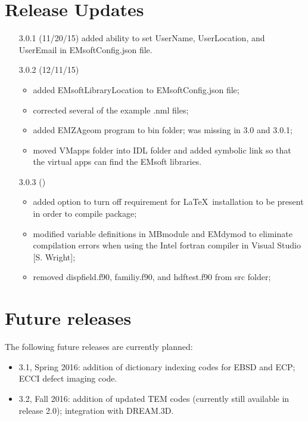 \documentclass[DIV=calc, paper=letter, fontsize=11pt]{scrartcl}	 %
\begin{document}
\newpage
\section{Release Updates}
\begin{itemize}
	\item[3.0.1] (11/20/15) added ability to set UserName, UserLocation, and UserEmail in \textsf{EMsoftConfig.json} file.
	\item[3.0.2] (12/11/15) \begin{itemize}
		\item added EMsoftLibraryLocation to \textsf{EMsoftConfig.json} file;
		\item corrected several of the example .nml files;
		\item added EMZAgeom program to bin folder; was missing in 3.0 and 3.0.1;
		\item moved VMapps folder into IDL folder and added symbolic link so that the virtual apps can find the EMsoft libraries.
	\end{itemize}
        \item[3.0.3] () \begin{itemize}
                \item added option to turn off requirement for \LaTeX\ installation to be present in order to compile package;
                \item modified variable definitions in MBmodule and EMdymod to eliminate compilation errors when using the Intel fortran 
                compiler in Visual Studio [S. Wright]; 
                \item removed dispfield.f90, familiy.f90, and hdftest.f90 from src folder;
        \end{itemize}
\end{itemize}

\section{Future releases}
The following future releases are currently planned:
\begin{itemize}
	\item 3.1, Spring 2016: addition of dictionary indexing codes for EBSD and ECP; ECCI defect imaging code.
	\item 3.2, Fall 2016: addition of updated TEM codes (currently still available in release 2.0); integration with DREAM.3D.
\end{itemize}
\end{document}
